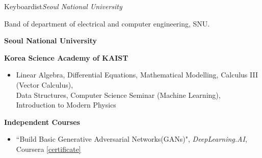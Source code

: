 \documentclass{cv}
\begin{document}



{Keyboardist}{\textit{Seoul National University}}
{
    \item Band of department of electrical and computer engineering, SNU.
}


\textbf{Seoul National University}


\textbf{Korea Science Academy of KAIST}
\begin{itemize}
    \item Linear Algebra, Differential Equations, Mathematical Modelling, Calculus III (Vector Calculus), \\ Data Structures, Computer Science Seminar (Machine Learning), Introduction to Modern Physics
\end{itemize}


\textbf{Independent Courses}
\begin{itemize}
    \item ``Build Basic Generative Adversarial Networks(GANs)", \textit{DeepLearning.AI}, Coursera \href{https://coursera.org/share/9645523a0b1ab41a76ccbe3cac57da39}{[certificate]}
\end{itemize}

\end{document}
